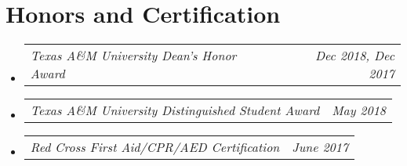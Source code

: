 \documentclass[letterpaper,11pt]{article}
\makeatletter
\newcommand{\resumeAward}[2]{
  \vspace{-1pt}
    \item\begin{tabular*}{0.97\textwidth}{l@{\extracolsep{\fill}}r}
    \textit{\small#1} & \textit{\small #2} \\
    \end{tabular*}\vspace{-20pt}
}
\newcommand{\resumeSubHeadingListStart}{\begin{itemize}[leftmargin=*]}
\newcommand{\resumeSubHeadingListEnd}{\end{itemize}}
\makeatother
\begin{document}
\section{Honors and Certification}
  \resumeSubHeadingListStart
    \resumeAward{Texas A\&M University Dean's Honor Award}{Dec 2018, Dec 2017}
    \resumeAward{Texas A\&M University Distinguished Student Award}{May 2018}
    \resumeAward{Red Cross First Aid/CPR/AED Certification}{June 2017}
\resumeSubHeadingListEnd
\vspace{5pt}

\end{document}
